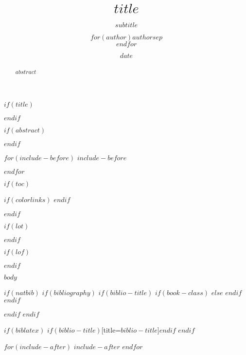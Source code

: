 \documentclass[doctor,twoside,chapterhead,otf]{znufethesis}
\title{\LARGE\textbf{$title$}}
\title{}
\subtitle{$subtitle$}
\author{$for(author)$$author$$sep$ \\ $endfor$}
\author{}
\date{$date$}
\date{}
\begin{document}
$if(title)$
\maketitle
$endif$

\cleardoublepage
\frontmatter
\pagestyle{plain}

$if(abstract)$
\begin{abstract}
$abstract$
\end{abstract}
$endif$




$for(include-before)$
$include-before$

$endfor$

$if(toc)$
{
$if(colorlinks)$
\hypersetup{linkcolor=$if(toccolor)$$toccolor$$else$black$endif$}
$endif$

\setcounter{tocdepth}{$toc-depth$}
\cleardoublepage
{} %
\tableofcontents        %
}
$endif$

$if(lot)$
\cleardoublepage
{} %
\listoftables           %
$endif$

$if(lof)$
\cleardoublepage
{} %

\listoffigures          %
$endif$

\cleardoublepage
{} %

\mainmatter
\pagestyle{mpage}

$body$

$if(natbib)$
$if(bibliography)$
$if(biblio-title)$
$if(book-class)$
\renewcommand\bibname{$biblio-title$}
$else$
\renewcommand\refname{$biblio-title$}
$endif$
$endif$


$endif$
$endif$

$if(biblatex)$
\printbibliography$if(biblio-title)$[title=$biblio-title$]$endif$
$endif$

$for(include-after)$
$include-after$
$endfor$
\end{document}
